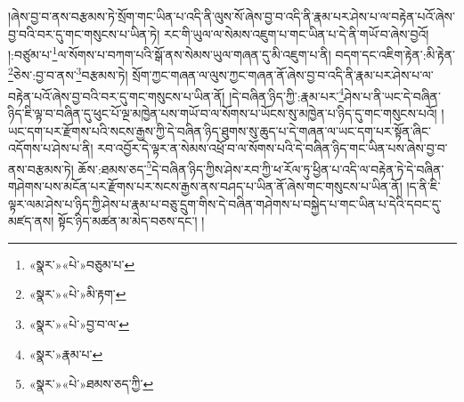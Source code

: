 །ཞེས་བྱ་བ་ནས་བརྩམས་ཏེ་སྲོག་གང་ཡིན་པ་འདི་ནི་ལུས་སོ་ཞེས་བྱ་བ་འདི་ནི་རྣམ་པར་ཤེས་པ་ལ་བརྟེན་པའོ་ཞེས་བྱ་བའི་བར་དུ་གང་གསུངས་པ་ཡིན་ཏེ། རང་གི་ཡུལ་ལ་སེམས་འཇུག་པ་གང་ཡིན་པ་དེ་ནི་གཡོ་བ་ཞེས་བྱའོ། །:བཙུམ་པ་\footnote{«སྣར་»«པེ་»བཅུམ་པ་}ལ་སོགས་པ་བཀག་པའི་སྒོ་ནས་སེམས་ཡུལ་གཞན་དུ་མི་འཇུག་པ་ནི། བདག་དང་འཇིག་རྟེན་:མི་རྟེན་\footnote{«སྣར་»«པེ་»མི་རྟག་}ཅེས་:བྱ་བ་ནས་\footnote{«སྣར་»«པེ་»བྱ་བ་ལ་}བརྩམས་ཏེ། སྲོག་ཀྱང་གཞན་ལ་ལུས་ཀྱང་གཞན་ནོ་ཞེས་བྱ་བ་འདི་ནི་རྣམ་པར་ཤེས་པ་ལ་བརྟེན་པའོ་ཞེས་བྱ་བའི་བར་དུ་གང་གསུངས་པ་ཡིན་ནོ། །དེ་བཞིན་ཉིད་ཀྱི་:རྣམ་པར་\footnote{«སྣར་»རྣམ་པ་}ཤེས་པ་ནི་ཡང་དེ་བཞིན་ཉིད་ཇི་ལྟ་བ་བཞིན་དུ་ཕུང་པོ་ལྔ་མཁྱེན་པས་གཡོ་བ་ལ་སོགས་པ་ཡོངས་སུ་མཁྱེན་པ་ཉིད་དུ་གང་གསུངས་པའོ། །ཡང་དག་པར་རྫོགས་པའི་སངས་རྒྱས་ཀྱི་དེ་བཞིན་ཉིད་ཐུགས་སུ་ཆུད་པ་དེ་གཞན་ལ་ཡང་དག་པར་སྟོན་ཞིང་འདོགས་པ་ཤེས་པ་ནི། རབ་འབྱོར་དེ་ལྟར་ན་སེམས་འཕྲོ་བ་ལ་སོགས་པའི་དེ་བཞིན་ཉིད་གང་ཡིན་པས་ཞེས་བྱ་བ་ནས་བརྩམས་ཏེ། ཆོས་:ཐམས་ཅད་\footnote{«སྣར་»«པེ་»ཐམས་ཅད་ཀྱི་}དེ་བཞིན་ཉིད་ཀྱིས་ཤེས་རབ་ཀྱི་ཕ་རོལ་ཏུ་ཕྱིན་པ་འདི་ལ་བརྟེན་ཏེ་དེ་བཞིན་གཤེགས་པས་མངོན་པར་རྫོགས་པར་སངས་རྒྱས་ནས་བཤད་པ་ཡིན་ནོ་ཞེས་གང་གསུངས་པ་ཡིན་ནོ། །ད་ནི་ཇི་ལྟར་ལམ་ཤེས་པ་ཉིད་ཀྱི་ཤེས་པ་རྣམ་པ་བཅུ་དྲུག་གིས་དེ་བཞིན་གཤེགས་པ་བསྐྱེད་པ་གང་ཡིན་པ་དེའི་དབང་དུ་མཛད་ནས། སྟོང་ཉིད་མཚན་མ་མེད་བཅས་དང་། །
